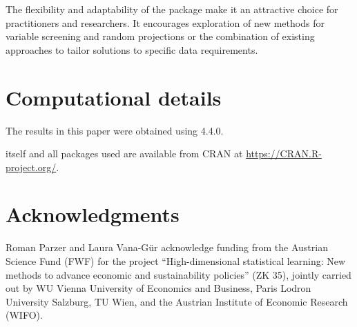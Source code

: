 \documentclass[
  article,
  nojss]{jss}
\begin{document}
The flexibility and adaptability of the  package make it an
attractive choice for practitioners and researchers. It encourages
exploration of new methods for variable screening and random projections
or the combination of existing approaches to tailor solutions to
specific data requirements.

\section*{Computational details}\label{computational-details}

The results in this paper were obtained using  4.4.0.

 itself and all packages used are available from CRAN at
\url{https://CRAN.R-project.org/}.

\section*{Acknowledgments}\label{acknowledgments}

Roman Parzer and Laura Vana-Gür acknowledge funding from the Austrian
Science Fund (FWF) for the project ``High-dimensional statistical
learning: New methods to advance economic and sustainability policies''
(ZK 35), jointly carried out by WU Vienna University of Economics and
Business, Paris Lodron University Salzburg, TU Wien, and the Austrian
Institute of Economic Research (WIFO).


\renewcommand\refname{References}
  
\end{document}
